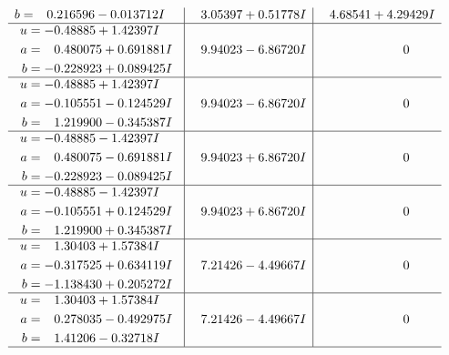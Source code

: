 \documentclass[1p]{elsarticle_modified}
\theoremstyle{definition}
\begin{document}
$$\begin{array}{c|c|c}
\begin{aligned}
b &= \phantom{-}0.216596 - 0.013712 I\end{aligned}
 & \phantom{-}3.05397 + 0.51778 I & \phantom{-}4.68541 + 4.29429 I \\ \hline\begin{aligned}
u &= -0.48885 + 1.42397 I \\
a &= \phantom{-}0.480075 + 0.691881 I \\
b &= -0.228923 + 0.089425 I\end{aligned}
 & \phantom{-}9.94023 - 6.86720 I & \phantom{-0.000000 } 0 \\ \hline\begin{aligned}
u &= -0.48885 + 1.42397 I \\
a &= -0.105551 - 0.124529 I \\
b &= \phantom{-}1.219900 - 0.345387 I\end{aligned}
 & \phantom{-}9.94023 - 6.86720 I & \phantom{-0.000000 } 0 \\ \hline\begin{aligned}
u &= -0.48885 - 1.42397 I \\
a &= \phantom{-}0.480075 - 0.691881 I \\
b &= -0.228923 - 0.089425 I\end{aligned}
 & \phantom{-}9.94023 + 6.86720 I & \phantom{-0.000000 } 0 \\ \hline\begin{aligned}
u &= -0.48885 - 1.42397 I \\
a &= -0.105551 + 0.124529 I \\
b &= \phantom{-}1.219900 + 0.345387 I\end{aligned}
 & \phantom{-}9.94023 + 6.86720 I & \phantom{-0.000000 } 0 \\ \hline\begin{aligned}
u &= \phantom{-}1.30403 + 1.57384 I \\
a &= -0.317525 + 0.634119 I \\
b &= -1.138430 + 0.205272 I\end{aligned}
 & \phantom{-}7.21426 - 4.49667 I & \phantom{-0.000000 } 0 \\ \hline\begin{aligned}
u &= \phantom{-}1.30403 + 1.57384 I \\
a &= \phantom{-}0.278035 - 0.492975 I \\
b &= \phantom{-}1.41206 - 0.32718 I\end{aligned}
 & \phantom{-}7.21426 - 4.49667 I & \phantom{-0.000000 } 0\\
 \hline 
 \end{array}$$\newpage$$\begin{array}{c|c|c}  

\end{array}$$
\end{document}
